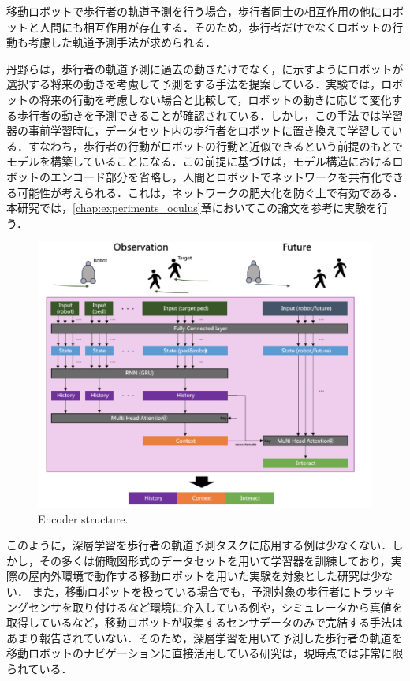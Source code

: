 \protect{}

\newpage

移動ロボットで歩行者の軌道予測を行う場合，歩行者同士の相互作用の他にロボットと人間にも相互作用が存在する．そのため，歩行者だけでなくロボットの行動も考慮した軌道予測手法が求められる．

丹野ら\cite{si2023-tanno}は，歩行者の軌道予測に過去の動きだけでなく，に示すようにロボットが選択する将来の動きを考慮して予測をする手法を提案している．実験では，ロボットの将来の行動を考慮しない場合と比較して，ロボットの動きに応じて変化する歩行者の動きを予測できることが確認されている．しかし，この手法では学習器の事前学習時に，データセット内の歩行者をロボットに置き換えて学習している．すなわち，歩行者の行動がロボットの行動と近似できるという前提のもとでモデルを構築していることになる．この前提に基づけば，モデル構造におけるロボットのエンコード部分を省略し，人間とロボットでネットワークを共有化できる可能性が考えられる．これは，ネットワークの肥大化を防ぐ上で有効である．
本研究では，\ref{chap:experiments_oculus}章においてこの論文\cite{si2023-tanno}を参考に実験を行う．
\begin{figure}[hbtp]
     \centering
    \includegraphics[keepaspectratio, scale=0.64]
         {images/future-robot.png}
    \caption{Encoder structure.\protect\footnotemark[5]}
    \label{Fig:future-robot}
\end{figure}
\protect{}

このように，深層学習を歩行者の軌道予測タスクに応用する例は少なくない．しかし，その多くは俯瞰図形式のデータセットを用いて学習器を訓練しており，実際の屋内外環境で動作する移動ロボットを用いた実験を対象とした研究は少ない．
また，移動ロボットを扱っている場合でも，予測対象の歩行者にトラッキングセンサを取り付けるなど環境に介入している例や，シミュレータから真値を取得しているなど，移動ロボットが収集するセンサデータのみで完結する手法はあまり報告されていない．そのため，深層学習を用いて予測した歩行者の軌道を移動ロボットのナビゲーションに直接活用している研究は，現時点では非常に限られている．

\newpage